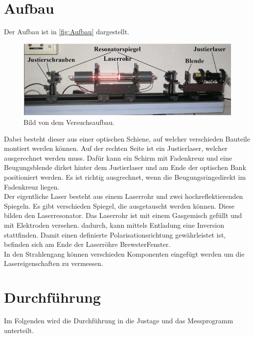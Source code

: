 \section{Aufbau}
\label{sec:Aufbau}
Der Aufbau ist in \autoref{fig:Aufbau} dargestellt.
\begin{figure}[H]
    \centering
    \includegraphics[scale=0.7]{Abbildungen/Aufbau.png}
    \caption{Bild von dem Versuchsaufbau.\cite{V61}}
    \label{fig:Aufbau}
\end{figure}
Dabei besteht dieser aus einer optischen Schiene, auf welcher verschieden Bauteile montiert werden können.
Auf der rechten Seite ist ein Justierlaser, welcher ausgerechnet werden muss. Dafür kann ein Schirm mit Fadenkreuz und eine Beugungsblende
dirket hinter dem Justierlaser und am Ende der optischen Bank positioniert werden. Es ist richtig ausgrechnet, wenn die 
Beugungsringedirekt im Fadenkreuz liegen.\\
Der eigentliche Laser besteht aus einem Laserrohr und zwei hochreflektierenden Spiegeln.
Es gibt verschieden Spiegel, die ausgetauscht werden können. Diese bilden den Laserresonator.
Das Laserrohr ist mit einem Gasgemisch gefüllt und mit Elektroden versehen. dadurch, kann mittels Entladung eine Inversion stattfinden.
Damit einen definierte Polarisationsrichtung gewährleistet ist, befinden sich am Ende der Laserröhre BrewsterFenster.\\
In den Strahlengang können verschieden Komponenten eingefügt werden um die Lasereigenschaften zu vermessen.

\section{Durchführung}
\label{sec:Durchführung}
Im Folgenden wird die Durchführung in die Justage und das Messprogramm unterteilt.

